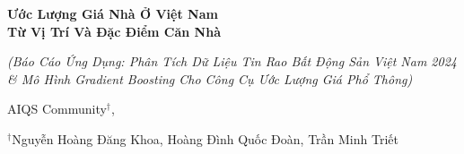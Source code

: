 \documentclass[11pt]{article}
\begin{document}
\renewcommand{\labelitemi}{-}



\thispagestyle{firstpage}

\vspace*{0.1cm}

\begin{center}
    \LARGE \textbf{Ước Lượng Giá Nhà Ở Việt Nam\\Từ Vị Trí Và Đặc Điểm Căn Nhà}

    \vspace{0.2cm}
    \normalsize \textit{(Báo Cáo Ứng Dụng: Phân Tích Dữ Liệu Tin Rao Bất Động Sản Việt Nam 2024\\\& Mô Hình Gradient Boosting Cho Công Cụ Ước Lượng Giá Phổ Thông)}

    \vspace{0.4cm}

    \small AIQS Community$^{\dagger}$,

    $^{\dagger}$Nguyễn Hoàng Đăng Khoa, Hoàng Đình Quốc Đoàn, Trần Minh Triết

    \vspace{0.3cm}
\end{center}

\vspace{0.8cm}
\end{document}
